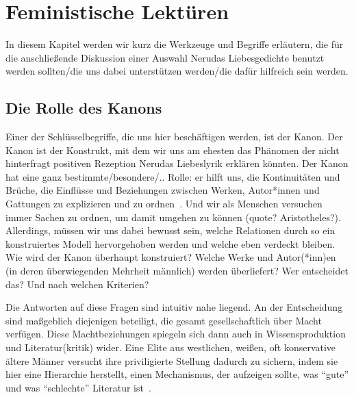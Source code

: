 \section{Feministische Lektüren}


In diesem Kapitel werden wir kurz die Werkzeuge und Begriffe erläutern, die für die anschließende Diskussion einer Auswahl Nerudas Liebesgedichte benutzt werden sollten/die uns dabei unterstützen werden/die dafür hilfreich sein werden.

\begin{comment}
feminist criticism very quickly moved
beyond merely "expos[ing] sexism in one work of literature after
another"\autocite{Kolodny1980}
--> Tu ich das? Merely exposing sexism in one work of literature? Ist es ok? mach ich vlt sonst was anderes?
\end{comment}


\subsection{Die Rolle des Kanons}

Einer der Schlüsselbegriffe, die uns hier beschäftigen werden, ist der Kanon.
Der Kanon ist der Konstrukt, mit dem wir uns am ehesten das Phänomen der nicht hinterfragt positiven Rezeption Nerudas Liebeslyrik erklären könnten.
Der Kanon hat eine ganz bestimmte/besondere/.. Rolle: er hilft uns, die Kontinuitäten und Brüche, die Einflüsse und Beziehungen zwischen Werken, Autor*innen und Gattungen zu explizieren und zu ordnen~\autocite{Kolodny1980}.
Und wir als Menschen versuchen immer Sachen zu ordnen, um damit umgehen zu können (quote? Aristotheles?). %
Allerdings, müssen wir uns dabei bewusst sein, welche Relationen durch so ein konstruiertes Modell hervorgehoben werden und welche eben verdeckt bleiben.
Wie wird der Kanon überhaupt konstruiert?
Welche Werke und Autor(*inn)en (in deren überwiegenden Mehrheit männlich) werden überliefert?
Wer entscheidet das?
Und nach welchen Kriterien?

Die Antworten auf diese Fragen sind intuitiv nahe liegend.
An der Entscheidung sind maßgeblich diejenigen beteiligt, die gesamt gesellschaftlich über Macht verfügen.
Diese Machtbeziehungen spiegeln sich dann auch in Wissensproduktion und Literatur(kritik) wider.
Eine Elite aus westlichen, weißen, oft konservative ältere Männer versucht ihre priviligierte Stellung dadurch zu sichern, indem sie hier eine Hierarchie herstellt, einen Mechanismus, der aufzeigen sollte, was ``gute'' und was ``schlechte'' Literatur ist~\autocite{North2013}.%

